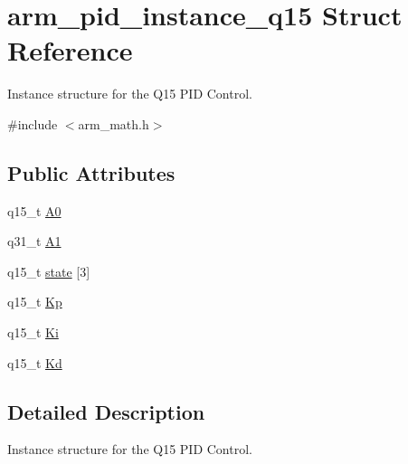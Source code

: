 \hypertarget{structarm__pid__instance__q15}{\section{arm\-\_\-pid\-\_\-instance\-\_\-q15 Struct Reference}
\label{structarm__pid__instance__q15}
}


Instance structure for the Q15 P\-I\-D Control.  




{\ttfamily \#include $<$arm\-\_\-math.\-h$>$}

\subsection*{Public Attributes}
\begin{DoxyCompactItemize}
\item 
q15\-\_\-t \hyperlink{structarm__pid__instance__q15_ad77f3a2823c7f96de42c92a3fbf3246b}{A0}
\item 
q31\-\_\-t \hyperlink{structarm__pid__instance__q15_a1b8412c517071962a9acfdc6778906ec}{A1}
\item 
q15\-\_\-t \hyperlink{structarm__pid__instance__q15_a4a3f0a878b5b6b055e3478a2f244cd30}{state} \mbox{[}3\mbox{]}
\item 
q15\-\_\-t \hyperlink{structarm__pid__instance__q15_ad228aae24a1b6d855c93a8b9bbc1c4f1}{Kp}
\item 
q15\-\_\-t \hyperlink{structarm__pid__instance__q15_a0dcc19d5c8f7bc401acea9e8318cd777}{Ki}
\item 
q15\-\_\-t \hyperlink{structarm__pid__instance__q15_af5d4b53091f19eff7536636b7cc43111}{Kd}
\end{DoxyCompactItemize}


\subsection{Detailed Description}
Instance structure for the Q15 P\-I\-D Control. 

